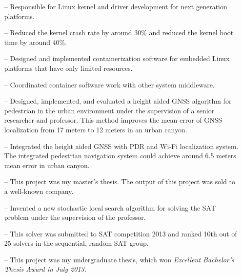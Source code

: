 \documentclass[10pt,a4paper,roman]{moderncv}        %
\begin{document}
\begin{itemize}
  \item[--]{Responsible for Linux kernel and driver development for next
    generation platforms. }
  \item[--]{Reduced the kernel crash rate by around 30\% and reduced the kernel boot time by around 40\%.}
  \item[--]{Designed and implemented containerization software for embedded Linux
    platforms that have only limited resources.}
  \item[--]{Coordinated container software work with other system middleware.}
\end{itemize}

\begin{itemize}
  \item[--]{Designed, implemented, and evaluated a height aided GNSS algorithm for
    pedestrian in the urban environment under the supervision of a senior researcher
  and professor. This method improves the mean error of GNSS localization from 17 meters to 12 meters in an urban canyon.}
  \item[--]{Integrated the height aided GNSS with PDR and Wi-Fi localization system. The integrated pedestrian navigation system could achieve around 6.5 meters mean error in urban canyon.}
  \item[--]{This project was my master's thesis. The output of this project was sold to a well-known company.}
\end{itemize}

\begin{itemize}
  \item[--]{Invented a new stochastic local search algorithm for solving the SAT problem under the supervision of the professor.}
  \item[--]{This solver was submitted to SAT competition 2013 and ranked 10th out of 25 solvers in the sequential, random SAT group.}
  \item[--]{This project was my undergraduate thesis, which won \em{Excellent
Bachelor's Thesis Award} in July 2013.}
\end{itemize}
\end{document}
